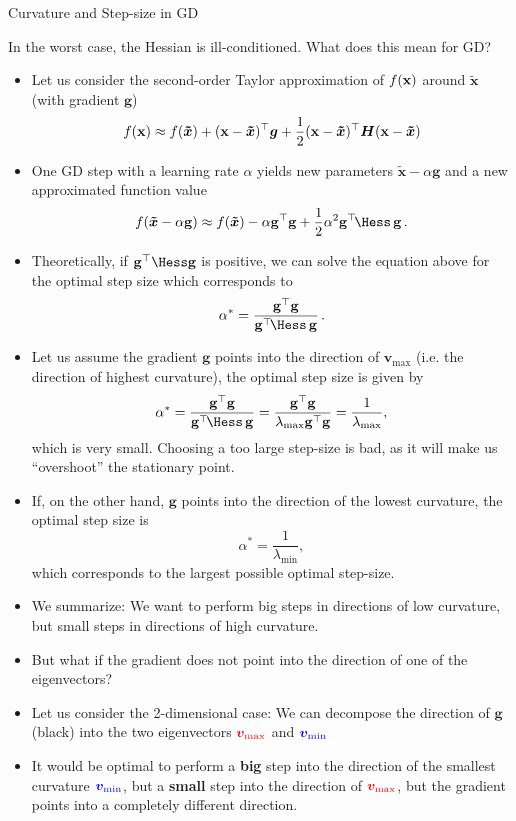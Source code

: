\documentclass[11pt,compress,t,notes=noshow, xcolor=table]{beamer}
\begin{document}
\begin{vbframe}{Curvature and Step-size in GD}
	
	In the worst case, the Hessian is ill-conditioned. What does this mean for GD?

	\begin{itemize}
		\item Let us consider the second-order Taylor approximation of $f(\mathbf{x})$ around $\bm{\tilde{x}}$ (with gradient $\mathbf{g}$)
		$$
		f(\mathbf{x}) \approx f(\bm{\tilde{x}}) + (\mathbf{x}-\bm{\tilde{x}})^\top \bm{g} +
		\frac 12(\mathbf{x}-\bm{\tilde{x}})^\top \bm{H}(\mathbf{x}-\bm{\tilde{x}})
		$$
		\item One GD step with a learning rate $\alpha$ yields new parameters $\bm{\tilde{x}}-\alpha \mathbf{g}$ and a new approximated function value
		$$
		f(\bm{\tilde{x}}-\alpha \mathbf{g}) \approx f(\bm{\tilde{x}}) - \alpha \mathbf{g}^\top\mathbf{g} + \frac{1}{2}	\alpha^2 \mathbf{g}^\top\!\Hess\,\mathbf{g}  \,.
		$$ 

		\item Theoretically, if $\mathbf{g}^\top \Hess \mathbf{g}$ is positive, we can solve the equation above for the optimal step size which corresponds to 
		$$
		\alpha^* = \frac{\mathbf{g}^\top \mathbf{g}}{\mathbf{g}^\top \!\Hess\, \mathbf{g}}  \,.
		$$

		\framebreak 
		
		\item Let us assume the gradient $\mathbf{g}$ points into the direction of $\bm{v}_{\text{max}}$ (i.e. the direction of highest curvature), the optimal step size is given by 
		$$
		\alpha^* = \frac{\mathbf{g}^\top \mathbf{g}}{\mathbf{g}^\top \!\Hess\, \mathbf{g}} = \frac{\mathbf{g}^\top \mathbf{g}}{\lambda_{\text{max}} \mathbf{g}^\top   \mathbf{g}} = \frac{1}{\lambda_{\text{max}}}, 
		$$ 
		which is very small. Choosing a too large step-size is bad, as it will make us \enquote{overshoot} the stationary point.
		\item If, on the other hand, $\mathbf{g}$ points into the direction of the lowest curvature, the optimal step size is 
		$$
		\alpha^* = \frac{1}{\lambda_{\text{min}}}, 
		$$
		which corresponds to the largest possible optimal step-size.
		\item We summarize: We want to perform big steps in directions of low curvature, but small steps in directions of high curvature.

		
		\framebreak 
		
		\item But what if the gradient does not point into the direction of one of the eigenvectors? 
		\item Let us consider the 2-dimensional case: We can decompose the direction of $\bm{g}$ (black) into the two eigenvectors $\textcolor{red}{\bm{v}_{\text{max}}}$ and $\textcolor{blue}{\bm{v}_{\text{min}}}$
		\item It would be optimal to perform a \textbf{big} step into the direction of the smallest curvature $\textcolor{blue}{\bm{v}_{\text{min}}}$, but a \textbf{small} step into the direction of $\textcolor{red}{\bm{v}_{\text{max}}}$, but the gradient points into a completely different direction. 
	\end{itemize}
	

\end{vbframe}
\end{document}
